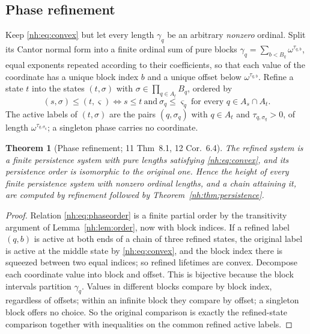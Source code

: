 \documentclass[11pt,a4paper]{article}
\newtheorem{theorem}{Theorem}[section]
\theoremstyle{definition}
\theoremstyle{remark}
\begin{document}
\subsection{Phase refinement}

Keep \eqref{nh:eq:convex} but let every length $\gamma_q$ be an arbitrary
\emph{nonzero} ordinal. Split its Cantor normal form into a finite ordinal sum
of pure blocks $\gamma_q=\sum_{b<B_q}\omega^{\tau_{q,b}}$, equal exponents
repeated according to their coefficients, so that each value of the coordinate
has a unique block index $b$ and a unique offset below $\omega^{\tau_{q,b}}$.
Refine a state $t$ into the states $(t,\sigma)$ with
$\sigma\in\prod_{q\in A_t}B_q$, ordered by
\begin{equation}\label{nh:eq:phaseorder}
 (s,\sigma)\le(t,\varsigma)\iff s\le t\ \text{and}\ \sigma_q\le\varsigma_q
 \ \text{for every }q\in A_s\cap A_t .
\end{equation}
The active labels of $(t,\sigma)$ are the pairs $(q,\sigma_q)$ with
$q\in A_t$ and $\tau_{q,\sigma_q}>0$, of length $\omega^{\tau_{q,\sigma_q}}$; a
singleton phase carries no coordinate.

\begin{theorem}[Phase refinement; 11 Thm~8.1, 12 Cor.~6.4]\label{nh:thm:phase}
The refined system is a finite persistence system with pure lengths
satisfying \eqref{nh:eq:convex}, and its persistence order is isomorphic to
the original one. Hence the height of every finite persistence system with
nonzero ordinal lengths, and a chain attaining it, are computed by refinement
followed by Theorem~\ref{nh:thm:persistence}.
\end{theorem}
\begin{proof}
Relation \eqref{nh:eq:phaseorder} is a finite partial order by the
transitivity argument of Lemma~\ref{nh:lem:order}, now with block indices.
If a refined label $(q,b)$ is active at both ends of a chain of three refined
states, the original label is active at the middle state by
\eqref{nh:eq:convex}, and the block index there is squeezed between two equal
indices; so refined lifetimes are convex. Decompose each coordinate value into
block and offset. This is bijective because the block intervals partition
$\gamma_q$. Values in different blocks compare by block index, regardless of
offsets; within an infinite block they compare by offset; a singleton block
offers no choice. So the original comparison is exactly the refined-state
comparison together with inequalities on the common refined active labels.
\end{proof}
\end{document}
